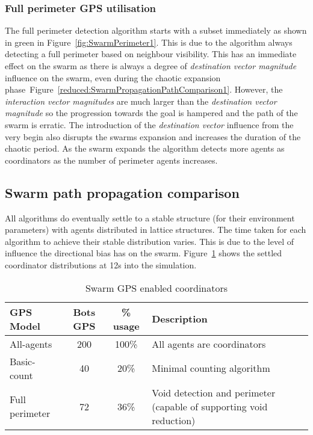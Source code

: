\documentclass{ieeeaccess}
\begin{document}
\subsubsection{Full perimeter GPS utilisation\label{section:SwarmPerimeter4}}
The full perimeter detection algorithm starts with a subset immediately as shown in green in Figure~\ref{fig:SwarmPerimeter1}. This is due to the algorithm always detecting a full perimeter based on neighbour visibility. This has an immediate effect on the swarm as there is always a degree of \textit{destination vector magnitude} influence on the swarm, even during the chaotic expansion phase~Figure~\ref{reduced:SwarmPropagationPathComparison1}. However, the \textit{interaction vector magnitudes} are much larger than the \textit{destination vector magnitude} so the progression towards the goal is hampered and the path of the swarm is erratic. The introduction of the \textit{destination vector} influence from the very begin also disrupts the swarms expansion and increases the duration of the chaotic period. As the swarm expands the algorithm detects more agents as coordinators as the number of perimeter agents increases.

\subsection{Swarm path propagation comparison\label{section:compareBaselineAll1}}
All algorithms do eventually settle to a stable structure (for their environment parameters) with agents distributed in lattice structures. The time taken for each algorithm to achieve their stable distribution varies. This is due to the level of influence the directional bias has on the swarm. Figure~\ref{tab:GPSUsage} shows the settled coordinator distributions at 12s into the simulation.

\begin{table}
\begin{center}
\begin{tabular}{| p{1.5cm} | c | c | p{3cm} |}
\hline
GPS Model & Bots GPS & \% usage & Description \\ \hline
All-agents & 200 & 100\% & All agents are coordinators \\ \hline
Basic-count & 40 & 20\% & Minimal counting algorithm\\ \hline
Full perimeter & 72 & 36\% & Void detection and perimeter (capable of supporting void reduction)\\  \hline
\end{tabular}\caption{Swarm GPS enabled coordinators} \label{tab:GPSUsage}
\end{center}
\end{table}
\end{document}
